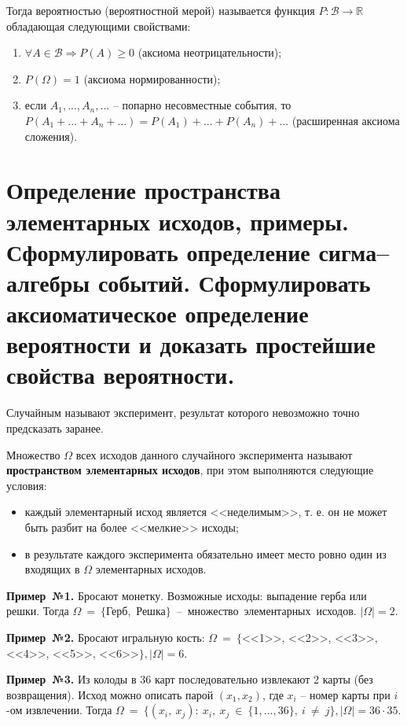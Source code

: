 Тогда вероятностью (вероятностной мерой) называется функция $P: \mathcal{B} \rightarrow \mathbb{R}$ обладающая следующими свойствами: 

\begin{enumerate}[label=\arabic*)]
	\item $\forall A \in \mathcal{B} \Rightarrow P(A) \geq 0$ (аксиома неотрицательности);
	\item $P(\Omega) = 1$ (аксиома нормированности);
	\item если $A_1, ..., A_n,...$ -- попарно несовместные события, то $P(A_1 +...+A_n +...) = P(A_1)+...+P(A_n)+...$ (расширенная аксиома сложения).
\end{enumerate}

\section{Определение пространства элементарных исходов, примеры. Сформулировать определение сигма--алгебры событий. Сформулировать аксиоматическое определение вероятности и доказать простейшие свойства вероятности.}

Случайным называют эксперимент, результат которого невозможно точно предсказать заранее.

Множество $\Omega$ всех исходов данного случайного эксперимента называют \textbf{пространством элементарных исходов}, при этом выполняются следующие условия: 

\begin{itemize}
	\item каждый элементарный исход является <<неделимым>>, т. е. он не может быть разбит на более <<мелкие>> исходы;
	
	\item в результате каждого эксперимента обязательно имеет место ровно один из входящих в $\Omega$ элементарных исходов.
\end{itemize}

\textbf{Пример~№1.} Бросают монетку. Возможные исходы: выпадение герба или решки. Тогда $\Omega~=~\{$Герб,~Решка$\}$~--~множество~элементарных~исходов. $|\Omega| = 2$.

\textbf{Пример~№2.} Бросают игральную кость: $\Omega~=~\{$<<1>>, <<2>>, <<3>>, <<4>>, <<5>>, <<6>>$\}, |\Omega| = 6.$

\textbf{Пример~№3.} Из колоды в 36 карт последовательно извлекают 2 карты (без возвращения). Исход можно описать парой $(x_1, x_2)$, где $x_i$ -- номер карты при $i$-ом извлечении. Тогда $\Omega~=~\{(x_i,~x_j):~x_i,~x_j~\in~\{1, ..., 36\},~i~\neq~j\}, |\Omega| = 36 \cdot 35.$ 

